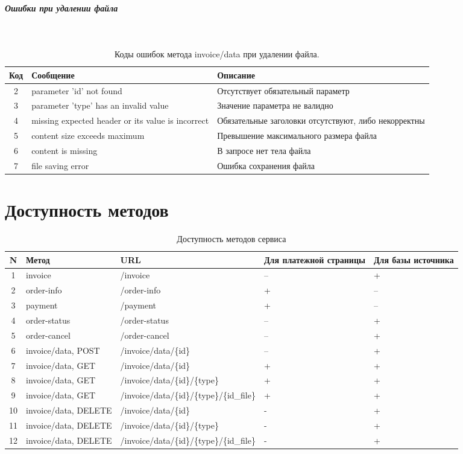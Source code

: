 \documentclass[11pt, a4paper]{article}
\begin{document}
\subparagraph{Ошибки при удалении файла}\
\begin{table}[H]
	\centering
	
	\begin{tabular}{| c | p{7cm} | p{8cm} |}
		\hline
		Код & Сообщение & Описание \\
		\hline
		2 & parameter 'id' not found & Отсутствует обязательный параметр \\
		3 & parameter 'type' has an invalid value & Значение параметра не валидно \\
		4 & missing expected header or its value is incorrect & Обязательные заголовки отсутствуют, либо некорректны \\
		5 & content size exceeds maximum & Превышение максимального размера файла \\
		6 & content is missing & В запросе нет тела файла \\
		7 & file saving error & Ошибка сохранения файла \\
		\hline
	\end{tabular}
	\caption{Коды ошибок метода invoice/data при удалении файла.}
\end{table}

\section{Доступность методов}

\begin{table}[H]
\centering
\begin{tabular}{| c | l | p{} | p{2cm} | p{2cm} |}
\hline
N & Метод & URL & Для платежной страницы & Для базы источника \\
\hline
1 & invoice & /invoice & -- & + \\
2 & order-info & /order-info & + & -- \\
3 & payment & /payment & + & -- \\
\hline
4 & order-status & /order-status & -- & + \\
5 & order-cancel & /order-cancel & -- & + \\
6 & invoice/data, POST & /invoice/data/\{id\} & -- & + \\
\hline
7 & invoice/data, GET & /invoice/data/\{id\} & + & + \\
8 & invoice/data, GET & /invoice/data/\{id\}/\{type\} & + & + \\
9 & invoice/data, GET & /invoice/data/\{id\}/\{type\}/\{id\_file\} & + & + \\
\hline
10 & invoice/data, DELETE & /invoice/data/\{id\} & - & + \\
11 & invoice/data, DELETE & /invoice/data/\{id\}/\{type\} & - & + \\
12 & invoice/data, DELETE & /invoice/data/\{id\}/\{type\}/\{id\_file\} & - & + \\
\hline
\end{tabular}
\caption{Доступность методов сервиса}
\end{table}
\end{document}
